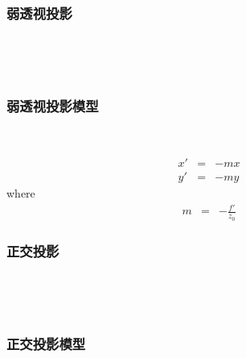 \documentclass{beamer}
\newcommand{\nospace}{}
\begin{document}
{{{{\begin{frame}
\end{frame}}{\begin{frame}
  \frametitle{弱透视投影}
  
  \
  
  \
  
  \qquad{}
\end{frame}}{\begin{frame}
  \frametitle{弱透视投影模型}
  
  \
  
  
  \begin{eqnarray*}
    x' & = & - m \nospace x\\
    y' & = & - m \nospace y
  \end{eqnarray*}
  where
  \begin{eqnarray*}
    m & = & - \frac{f'}{z_0}
  \end{eqnarray*}
\end{frame}}{\begin{frame}
  \frametitle{正交投影}
  
  \
  
  \
  
  \quad{}
\end{frame}}{\begin{frame}
  \frametitle{正交投影模型}
  

\end{frame}}}}}
\end{document}
